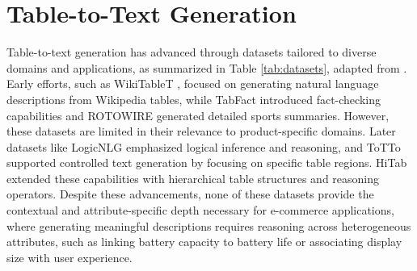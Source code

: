 \section{Table-to-Text Generation} 
Table-to-text generation has advanced through datasets tailored to diverse domains and applications, as summarized in Table \ref{tab:datasets}, adapted from \citep{zhao2023qtsummqueryfocusedsummarizationtabular}. Early efforts, such as WikiTableT \cite{chen2021wikitabletlargescaledatatotextdataset}, focused on generating natural language descriptions from Wikipedia tables, while TabFact \cite{2019TabFactA} introduced fact-checking capabilities and ROTOWIRE \cite{wiseman2017challengesdatatodocumentgeneration} generated detailed sports summaries. However, these datasets are limited in their relevance to product-specific domains. Later datasets like LogicNLG \cite{chen2020logicalnaturallanguagegeneration} emphasized logical inference and reasoning, and ToTTo \cite{parikh2020tottocontrolledtabletotextgeneration} supported controlled text generation by focusing on specific table regions. HiTab \cite{cheng-etal-2022-hitab} extended these capabilities with hierarchical table structures and reasoning operators. Despite these advancements, none of these datasets provide the contextual and attribute-specific depth necessary for e-commerce applications, where generating meaningful descriptions requires reasoning across heterogeneous attributes, such as linking battery capacity to battery life or associating display size with user experience.

